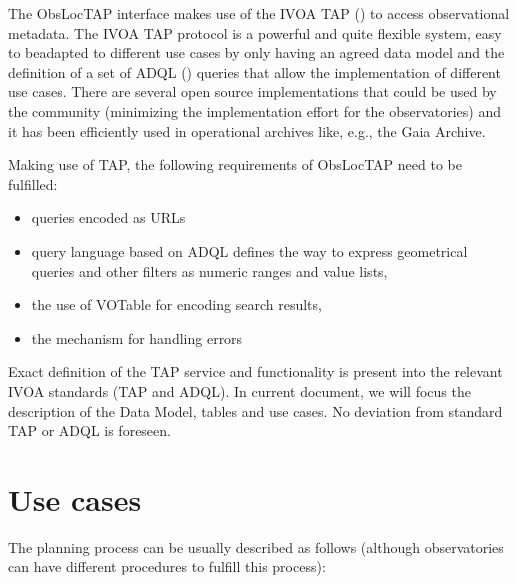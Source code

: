 \documentclass[11pt,a4paper]{ivoa}
\begin{document}
The ObsLocTAP interface makes use of the IVOA TAP (\cite{Pat10}) to access observational
metadata. The IVOA TAP protocol is a powerful and quite flexible system, easy to beadapted 
to different use cases by only having an agreed data model and the definition of a set of 
ADQL (\cite{Ina08}) queries that allow the implementation of different use cases. There 
are several open source implementations that could be used by the community (minimizing 
the implementation effort for the observatories) and it has been efficiently used in 
operational archives like, e.g., the Gaia Archive.

Making use of TAP, the following requirements of ObsLocTAP need to be fulfilled:

\begin{itemize}
	\item queries encoded as URLs\par

	\item query language based on ADQL defines the way to express geometrical queries and other filters as numeric ranges and value lists, 

	\item the use of VOTable for encoding search results,

	\item the mechanism for handling errors
\end{itemize}

Exact definition of the TAP service and functionality is present into the relevant IVOA 
standards (TAP and ADQL). In current document, we will focus the description of the Data 
Model, tables and use cases. No deviation from standard TAP or ADQL is foreseen.

\section{Use cases}
The planning process can be usually described as follows (although observatories can 
have different procedures to fulfill this process): 
\end{document}
